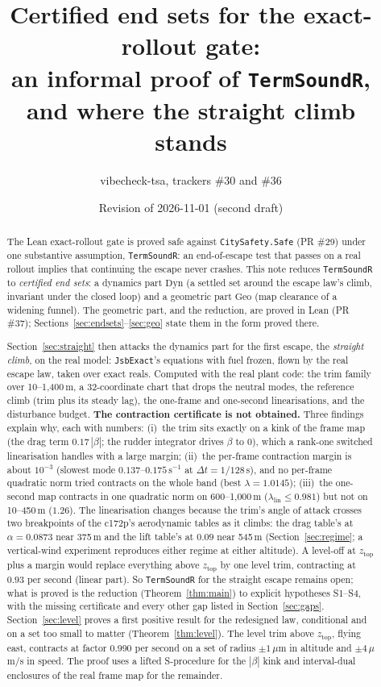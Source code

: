 \documentclass[11pt]{article}
\title{Certified end sets for the exact-rollout gate:\\ an informal proof of \texttt{TermSoundR}, and where the straight climb stands}
\author{vibecheck-tsa, trackers \#30 and \#36}
\date{Revision of 2026-11-01 (second draft)}
\newcommand{\Geo}{\ensuremath{\mathrm{Geo}}}
\newcommand{\Dyn}{\ensuremath{\mathrm{Dyn}}}
\newcommand{\zTop}{z_{\mathrm{top}}}
\begin{document}
\maketitle

\begin{abstract}
The Lean exact-rollout gate is proved safe against \texttt{CitySafety.Safe} (PR \#29) under one substantive assumption, \texttt{TermSoundR}: an end-of-escape test that passes on a real rollout implies that continuing the escape never crashes. This note reduces \texttt{TermSoundR} to \emph{certified end sets}: a dynamics part \Dyn{} (a settled set around the escape law's climb, invariant under the closed loop) and a geometric part \Geo{} (map clearance of a widening funnel). The geometric part, and the reduction, are proved in Lean (PR \#37); Sections~\ref{sec:endsets}--\ref{sec:geo} state them in the form proved there.

Section~\ref{sec:straight} then attacks the dynamics part for the first escape, the \emph{straight climb}, on the real model: \texttt{JsbExact}'s equations with fuel frozen, flown by the real escape law, taken over exact reals. Computed with the real plant code: the trim family over 10--1{,}400\,m, a 32-coordinate chart that drops the neutral modes, the reference climb (trim plus its steady lag), the one-frame and one-second linearisations, and the disturbance budget. \textbf{The contraction certificate is not obtained.} Three findings explain why, each with numbers: (i)~the trim sits exactly on a kink of the frame map (the drag term $0.17\,|\beta|$; the rudder integrator drives $\beta$ to $0$), which a rank-one switched linearisation handles with a large margin; (ii)~the per-frame contraction margin is about $10^{-3}$ (slowest mode $0.137$--$0.175\,\mathrm{s}^{-1}$ at $\Delta t = 1/128$\,s), and no per-frame quadratic norm tried contracts on the whole band (best $\lambda = 1.0145$); (iii)~the one-second map contracts in one quadratic norm on 600--1{,}000\,m ($\lambda_{\mathrm{lin}} \le 0.981$) but not on 10--450\,m ($1.26$). The linearisation changes because the trim's angle of attack crosses two breakpoints of the c172p's aerodynamic tables as it climbs: the drag table's at $\alpha = 0.0873$ near 375\,m and the lift table's at $0.09$ near 545\,m (Section~\ref{sec:regime}; a vertical-wind experiment reproduces either regime at either altitude). A level-off at $\zTop$ plus a margin would replace everything above $\zTop$ by one level trim, contracting at $0.93$ per second (linear part). So \texttt{TermSoundR} for the straight escape remains open; what is proved is the reduction (Theorem~\ref{thm:main}) to explicit hypotheses S1--S4, with the missing certificate and every other gap listed in Section~\ref{sec:gaps}. Section~\ref{sec:level} proves a first positive result for the redesigned law, conditional and on a set too small to matter (Theorem~\ref{thm:level}). The level trim above $\zTop$, flying east, contracts at factor 0.990 per second on a set of radius $\pm 1\,\mu$m in altitude and $\pm 4\,\mu$m/s in speed. The proof uses a lifted S-procedure for the $|\beta|$ kink and interval-dual enclosures of the real frame map for the remainder.
\end{abstract}
\end{document}
